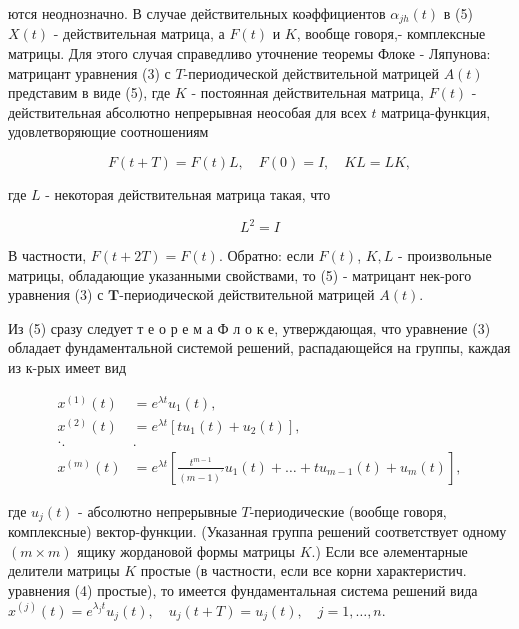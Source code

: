 \documentclass[10pt]{article}
\begin{document}
ются неоднозначно. В случае действительных коәффициентов $\alpha_{j h}(t)$ в (5) $X(t)$ - действительная матрица, а $F(t)$ и $K$, вообще говоря,- комплексные матрицы. Для этого случая справедливо уточнение теоремы Флоке - Ляпунова: матрицант уравнения (3) с $T$-периодической действительной матрицей $A(t)$ представим в виде (5), где $K$ - постоянная действительная матрица, $F(t)$ - действительная абсолютно непрерывная неособая для всех $t$ матрица-функция, удовлетворяющие соотношениям



\[

F(t+T)=F(t) L, \quad F(0)=I, \quad K L=L K,

\]



где $L$ - некоторая действительная матрица такая, что



\[

L^{2}=I

\]



В частности, $F(t+2 T)=F(t)$. Обратно: если $F(t)$, $K, L$ - произвольные матрицы, обладающие указанными свойствами, то (5) - матрицант нек-рого уравнения (3) с $\boldsymbol{T}$-периодической действительной матрицей $A(t)$.



Из (5) сразу следует т е о р е м а Ф л о к е, утверждающая, что уравнение (3) обладает фундаментальной системой решений, распадающейся на группы, каждая из к-рых имеет вид



\[

\begin{aligned}

x^{(1)}(t) & =e^{\lambda t} u_{1}(t), \\

x^{(2)}(t) & =e^{\lambda t}\left[t u_{1}(t)+u_{2}(t)\right], \\

\cdot . & . \\

x^{(m)}(t) & =e^{\lambda t}\left[\frac{t^{m-1}}{(m-1)^{\prime}} u_{1}(t)+\ldots+t u_{m-1}(t)+u_{m}(t)\right],

\end{aligned}

\]



где $u_{j}(t)$ - абсолютно непрерывные $T$-периодические (вообще говоря, комплексные) вектор-функции. (Указанная группа решений соответствует одному $(m \times m)$ ящику жордановой формы матрицы $K$.) Если все әлементарные делители матрицы $K$ простые (в частности, если все корни характеристич. уравнения (4) простые), то имеется фундаментальная система решений вида $x^{(j)}(t)=e^{\lambda_{j} t} u_{j}(t), \quad u_{j}(t+T)=u_{j}(t), \quad j=1, \ldots, n$.
\end{document}
